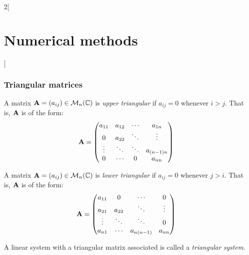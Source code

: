 \documentclass[../../../main.tex]{subfiles}
\begin{document}
\begin{multicols}{2}[\section{Numerical methods}]
  \subsubsection{Triangular matrices}
  \begin{definition}
    A matrix $\boldsymbol{\mathrm{A}}=(a_{ij})\in\mathcal{M}_n(\mathbb{C})$ is \textit{upper triangular} if $a_{ij}=0$ whenever $i>j$. That is, $\boldsymbol{\mathrm{A}}$ is of the form:
    $$\boldsymbol{\mathrm{A}}=
      \begin{pmatrix}
        a_{11} & a_{12} & \cdots & a_{1n}     \\
        0      & a_{22} & \ddots & \vdots     \\
        \vdots & \ddots & \ddots & a_{(n-1)n} \\
        0      & \cdots & 0      & a_{nn}
      \end{pmatrix}
    $$
  \end{definition}
  \begin{definition}
    A matrix $\boldsymbol{\mathrm{A}}=(a_{ij})\in\mathcal{M}_n(\mathbb{C})$ is \textit{lower triangular} if $a_{ij}=0$ whenever $j>i$. That is, $\boldsymbol{\mathrm{A}}$ is of the form:
    $$\boldsymbol{\mathrm{A}}=
      \begin{pmatrix}
        a_{11} & 0      & \cdots     & 0      \\
        a_{21} & a_{22} & \ddots     & \vdots \\
        \vdots & \ddots & \ddots     & 0      \\
        a_{n1} & \cdots & a_{n(n-1)} & a_{nn}
      \end{pmatrix}
    $$
  \end{definition}
  \begin{definition}
    A linear system with a triangular matrix associated is called a \textit{triangular system}.
  \end{definition}

\end{multicols}
\end{document}
